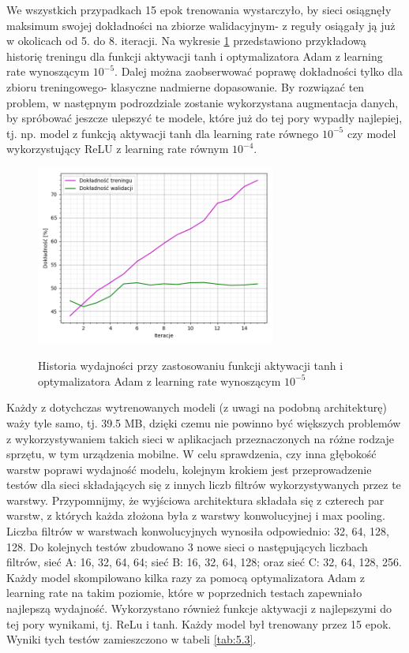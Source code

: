 We wszystkich przypadkach 15 epok trenowania wystarczyło, by sieci osiągnęły maksimum swojej dokładności na zbiorze walidacyjnym- z reguły osiągały ją już w okolicach od 5. do 8. iteracji. Na wykresie \ref{pic:5.2} przedstawiono przykładową historię treningu dla funkcji aktywacji tanh i optymalizatora Adam z learning rate wynoszącym $10^{-5}$. Dalej można zaobserwować poprawę dokładności tylko dla zbioru treningowego- klasyczne nadmierne dopasowanie. By rozwiązać ten problem, w następnym podrozdziale zostanie wykorzystana augmentacja danych, by spróbować jeszcze ulepszyć te modele, które już do tej pory wypadły najlepiej, tj. np. model z funkcją aktywacji tanh dla learning rate równego $10^{-5}$ czy model wykorzystujący ReLU z learning rate równym $10^{-4}$.

\begin{figure}[H]
    \caption{Historia wydajności przy zastosowaniu funkcji aktywacji tanh i optymalizatora Adam z learning rate wynoszącym $10^{-5}$}
    \centering
    \includegraphics[width=0.7\textwidth]{wykres2.png}
    \label{pic:5.2}
\end{figure}

Każdy z dotychczas wytrenowanych modeli (z uwagi na podobną architekturę) waży tyle samo, tj. 39.5 MB, dzięki czemu nie powinno być większych problemów z wykorzystywaniem takich sieci w aplikacjach przeznaczonych na różne rodzaje sprzętu, w tym urządzenia mobilne. W celu sprawdzenia, czy inna głębokość warstw poprawi wydajność modelu, kolejnym krokiem jest przeprowadzenie testów dla sieci składających się z innych liczb filtrów wykorzystywanych przez te warstwy. Przypomnijmy, że wyjściowa architektura składała się z czterech par warstw, z których każda złożona była z warstwy konwolucyjnej i max pooling. Liczba filtrów w warstwach konwolucyjnych wynosiła odpowiednio: 32, 64, 128, 128. Do kolejnych testów zbudowano 3 nowe sieci o następujących liczbach filtrów, sieć A: 16, 32, 64, 64; sieć B: 16, 32, 64, 128; oraz sieć C: 32, 64, 128, 256. Każdy model skompilowano kilka razy za pomocą optymalizatora Adam z learning rate na takim poziomie, które w poprzednich testach zapewniało najlepszą wydajność. Wykorzystano również funkcje aktywacji z najlepszymi do tej pory wynikami, tj. ReLu i tanh. Każdy model był trenowany przez 15 epok. Wyniki tych testów zamieszczono w tabeli \ref{tab:5.3}.

